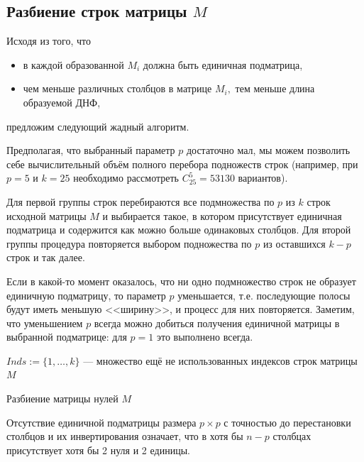 \documentclass[12pt,a4paper,oneside,fleqn,leqno]{article}
\theoremstyle{definition}
\begin{document}
		\subsection{Разбиение строк матрицы $M$}
			Исходя из того, что
			\begin{itemize}\itemsep=0pt
				\item
				в каждой образованной $M_i$ должна быть единичная подматрица,
				\item
					чем меньше различных столбцов в матрице $M_i,$ тем меньше длина образуемой ДНФ,
			\end{itemize}
			предложим следующий жадный алгоритм.\par
			Предполагая, что выбранный параметр $p$ достаточно мал, мы можем позволить себе вычислительный объём полного перебора подножеств строк (например, при $p = 5$ и $k = 25$ необходимо рассмотреть $C_{25}^5 = 53130$ вариантов).\par
			Для первой группы строк перебираются все подмножества по $p$ из $k$ строк исходной матрицы $M$ и выбирается такое, в котором присутствует единичная подматрица и содержится как можно больше одинаковых столбцов. Для второй группы процедура повторяется выбором подножества по $p$ из оставшихся $k - p$ строк и так далее.\par
			Если в какой-то момент оказалось, что ни одно подмножество строк не образует единичную подматрицу, то параметр $p$ уменьшается, т.е. последующие полосы будут иметь меньшую <<ширину>>, и процесс для них повторяется. Заметим, что уменьшением $p$ всегда можно добиться получения единичной матрицы в выбранной подматрице: для $p = 1$ это выполнено всегда.\par
		\begin{algorithm}[H]
			\SetAlgoLined
			$Inds \mathbin{:=} \{1,\ldots,k\}$ --- множество ещё не использованных индексов строк матрицы $M$\;
			\caption{Разбиение матрицы нулей $M$}
		\label{slice}
		\end{algorithm}\par
			Отсутствие единичной подматрицы размера $p \times p$ с точностью до перестановки столбцов и их инвертирования означает, что в хотя бы $n - p$ столбцах присутствует хотя бы 2 нуля и 2 единицы.\par
\end{document}
